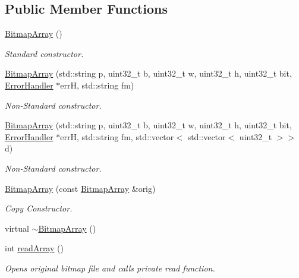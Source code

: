 \subsection*{Public Member Functions}
\begin{DoxyCompactItemize}
\item 
\mbox{\hyperlink{classBitmapArray_a582e5e54ec078d30fde87ae7b4540f32}{Bitmap\+Array}} ()
\begin{DoxyCompactList}\small\item\em Standard constructor. \end{DoxyCompactList}\item 
\mbox{\hyperlink{classBitmapArray_ae11059a1f2f1af199d0a2cf6f316397d}{Bitmap\+Array}} (std\+::string p, uint32\+\_\+t b, uint32\+\_\+t w, uint32\+\_\+t h, uint32\+\_\+t bit, \mbox{\hyperlink{classErrorHandler}{Error\+Handler}} $\ast$errH, std\+::string fm)
\begin{DoxyCompactList}\small\item\em Non-\/\+Standard constructor. \end{DoxyCompactList}\item 
\mbox{\hyperlink{classBitmapArray_afc98bc8debfd35e9ad09df5c126cdd7f}{Bitmap\+Array}} (std\+::string p, uint32\+\_\+t b, uint32\+\_\+t w, uint32\+\_\+t h, uint32\+\_\+t bit, \mbox{\hyperlink{classErrorHandler}{Error\+Handler}} $\ast$errH, std\+::string fm, std\+::vector$<$ std\+::vector$<$ uint32\+\_\+t $>$$>$ d)
\begin{DoxyCompactList}\small\item\em Non-\/\+Standard constructor. \end{DoxyCompactList}\item 
\mbox{\hyperlink{classBitmapArray_a07ce0273af824a8deff592ef1a43d7e5}{Bitmap\+Array}} (const \mbox{\hyperlink{classBitmapArray}{Bitmap\+Array}} \&orig)
\begin{DoxyCompactList}\small\item\em Copy Constructor. \end{DoxyCompactList}\item 
virtual \mbox{\hyperlink{classBitmapArray_acc21c3148de08fb85d2939821f9f2cf0}{$\sim$\+Bitmap\+Array}} ()
\item 
int \mbox{\hyperlink{classBitmapArray_a4ce4b5acc896040075be63a559799e7e}{read\+Array}} ()
\begin{DoxyCompactList}\small\item\em Opens original bitmap file and calls private read function. \end{DoxyCompactList}\item 
$$
\end{DoxyCompactItemize}
